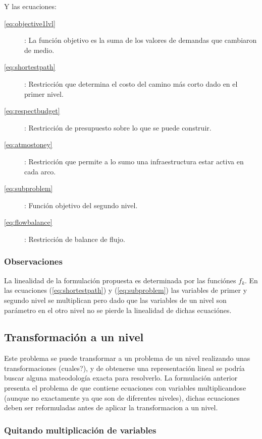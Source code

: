 \documentclass{article}
\begin{document}
  Y las ecuaciones:

  \begin{description}
    \item[\ref{eq:objective1lvl}]: La función objetivo es la suma de los valores de demandas que cambiaron de medio.
    \item[\ref{eq:shortestpath}]: Restricción que determina el costo del camino más corto dado en el primer nivel.
    \item[\ref{eq:respectbudget}]: Restricción de presupuesto sobre lo que se puede construir.
    \item[\ref{eq:atmostoney}]: Restricción que permite a lo sumo una infraestructura estar activa en cada arco.
    \item[\ref{eq:subproblem}]: Función objetivo del segundo nivel.
    \item[\ref{eq:flowbalance}]: Restricción de balance de flujo.
  \end{description}

  \subsubsection*{Observaciones}

  La linealidad de la formulación propuesta es determinada por las funciónes $f_k$. En las ecuaciones (\ref{eq:shortestpath}) y (\ref{eq:subproblem}) las variables de primer y segundo nivel se multiplican pero dado que las variables de un nivel son parámetro en el otro nivel no se pierde la linealidad de dichas ecuaciónes.


  \subsection*{Transformación a un nivel}

  Este problema se puede transformar a un problema de un nivel realizando unas transformaciones (cuales?), y de obtenerse una representación lineal se podría buscar alguna mateodología exacta para resolverlo. La formulación anterior presenta el problema de que contiene ecuaciones con variables multiplicandose (aunque no exactamente ya que son de diferentes niveles), dichas ecuaciones deben ser reformuladas antes de aplicar la transformacion a un nivel.

  \subsubsection*{Quitando multiplicación de variables}
\end{document}

